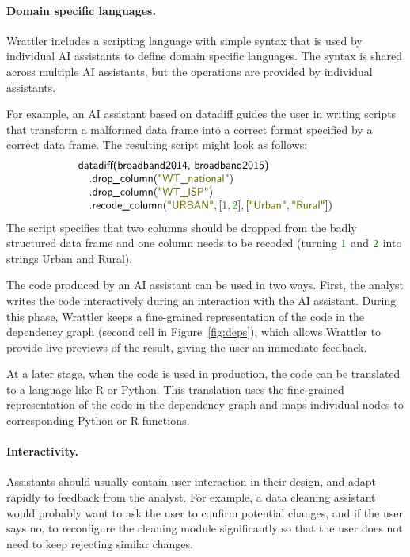 \documentclass[sigplan,preprint,10pt]{acmart}\settopmatter{printfolios=true,printccs=false,printacmref=false}
\newcommand{\num}[1]{\textcolor{numclr}{#1}}
\newcommand{\str}[1]{\textnormal{\textcolor{strclr}{\sffamily "#1"}}}
\newcommand{\strf}[1]{\textnormal{\textcolor{strclr}{\sffamily #1}}}
\newcommand{\ident}[1]{\textnormal{\sffamily #1}}
\begin{document}
{\paragraph{Domain specific languages.}

Wrattler includes a scripting language with simple syntax that is used
by individual AI assistants to define domain specific languages. The
syntax is shared across multiple AI assistants, but the operations are
provided by individual assistants.

For example, an AI assistant based on datadiff
guides the user in writing scripts that transform a malformed data frame into a correct format
specified by a correct data frame. The resulting script might look as follows:
%
\begin{equation*}
\begin{array}{l}
\ident{datadiff(broadband2014, broadband2015)}\\
\quad.\ident{drop\_column}(\str{WT\_national})\\
\quad.\ident{drop\_column}(\str{WT\_ISP})\\
\quad.\ident{recode\_column}(\str{URBAN}, [\num{1}, \num{2}], [\str{Urban},\str{Rural}])
\end{array}
\end{equation*}
%
The script specifies that two columns should be dropped from the badly structured data frame and
one column needs to be recoded (turning $\num{1}$ and $\num{2}$ into strings
\strf{Urban} and \strf{Rural}).

The code produced by an AI assistant can be used in two ways. First, the analyst writes the code
interactively during an interaction with the AI assistant. During this phase, Wrattler
keeps a fine-grained representation of the code in the dependency graph (second cell in
Figure~\ref{fig:deps}), which allows Wrattler to provide live previews of the result, giving the
user an immediate feedback.

At a later stage, when the code is used in production, the code can be translated to a language
like R or Python. This translation uses the fine-grained representation of the code in the
dependency graph and maps individual nodes to corresponding Python or R functions.

\paragraph{Interactivity.}

Assistants should usually contain user interaction in their design, and adapt rapidly to feedback
from the analyst. For example, a data cleaning assistant would probably want to ask the user to
confirm potential changes, and if the user says no, to reconfigure the cleaning module
significantly so that the user does not need to keep rejecting similar changes.

}
\end{document}
